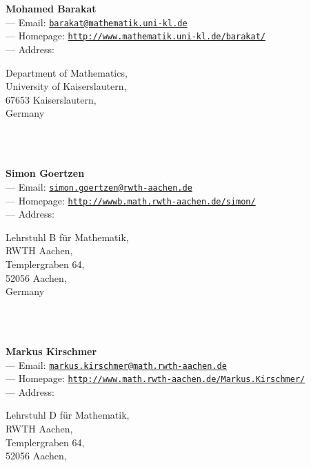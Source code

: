 \documentclass[a4paper,11pt]{report}
\begin{document}
\begin{titlepage}
\mbox{}\\
{\mbox{}\\
\small \noindent \textbf{Mohamed Barakat\\
    } --- Email: \href{mailto://barakat@mathematik.uni-kl.de} {\texttt{barakat@mathematik.uni-kl.de}}\\
 --- Homepage: \href{http://www.mathematik.uni-kl.de/~barakat/} {\texttt{http://www.mathematik.uni-kl.de/\texttt{}barakat/}}\\
 --- Address: \begin{minipage}[t]{8cm}\noindent
 Department of Mathematics, \\
 University of Kaiserslautern, \\
 67653 Kaiserslautern, \\
 Germany \end{minipage}
}\\
{\mbox{}\\
\small \noindent \textbf{Simon Goertzen\\
    } --- Email: \href{mailto://simon.goertzen@rwth-aachen.de} {\texttt{simon.goertzen@rwth-aachen.de}}\\
 --- Homepage: \href{http://wwwb.math.rwth-aachen.de/~simon/} {\texttt{http://wwwb.math.rwth-aachen.de/\texttt{}simon/}}\\
 --- Address: \begin{minipage}[t]{8cm}\noindent
 Lehrstuhl B f{\"u}r Mathematik, \\
 RWTH Aachen, \\
 Templergraben 64, \\
 52056 Aachen, \\
 Germany \end{minipage}
}\\
{\mbox{}\\
\small \noindent \textbf{Markus Kirschmer\\
    } --- Email: \href{mailto://markus.kirschmer@math.rwth-aachen.de} {\texttt{markus.kirschmer@math.rwth-aachen.de}}\\
 --- Homepage: \href{http://www.math.rwth-aachen.de/~Markus.Kirschmer/} {\texttt{http://www.math.rwth-aachen.de/\texttt{}Markus.Kirschmer/}}\\
 --- Address: \begin{minipage}[t]{8cm}\noindent
 Lehrstuhl D f{\"u}r Mathematik, \\
 RWTH Aachen, \\
 Templergraben 64, \\
 52056 Aachen, \\

\end{minipage}}
\end{titlepage}
\end{document}
